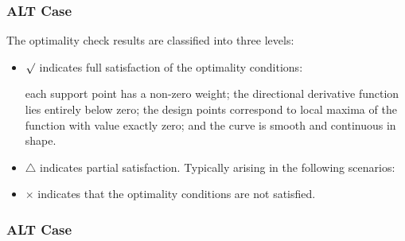 \documentclass[xcolor=dvipsnames,aspectratio=1610]{beamer}
\begin{document}
\begin{frame}
\frametitle{ALT Case}
The optimality check results are classified into three levels:

\begin{itemize}
\item $\surd$ indicates full satisfaction of the optimality conditions:

each support point has a non-zero weight; the directional derivative function lies entirely below zero; the design points correspond to local maxima of the function with value exactly zero; and the curve is smooth and continuous in shape.

\item $\triangle$ indicates partial satisfaction. Typically arising in the following scenarios:

\begin{figure}
\end{figure}

\item $\times$ indicates that the optimality conditions are not satisfied.
\end{itemize}

\end{frame}








\begin{frame}
\frametitle{ALT Case}

\begin{figure}
\end{figure}

\end{frame}
\end{document}
